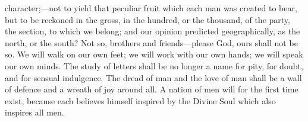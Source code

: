 char\-ac\-ter;---not to yield that peculiar fruit which each man was
created to bear, but to be reckoned in the gross, in the hundred, or
the thousand, of the party, the section, to which we belong; and our
opinion predicted geographically, as the north, or the south? Not
so, brothers and friends---please God, ours shall not be so. We will
walk on our own feet; we will work with our own hands; we will speak
our own minds. The study of letters shall be no longer a name for
pity, for doubt, and for sensual indulgence. The dread of man and the
love of man shall be a wall of defence and a wreath of joy around all.
A nation of men will for the first time exist, because each believes
himself inspired by the Divine Soul which also inspires all men.

